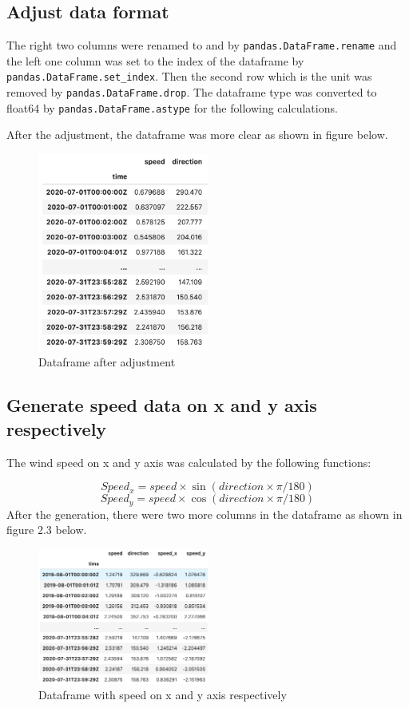 \documentclass[10pt]{report}
\begin{document}
\subsection{Adjust data format}
The right two columns were renamed to  and  by \texttt{pandas.DataFrame.rename} and the left one column was set to the index of the dataframe by \texttt{pandas.DataFrame.set\_index}. Then the second row which is the unit was removed by \texttt{pandas.DataFrame.drop}. The dataframe type was converted to float64 by \texttt{pandas.DataFrame.astype} for the following calculations.\par
After the adjustment, the dataframe was more clear as shown in figure below.\par
\begin{figure}[h!]
    \centering
    \includegraphics[width=0.50\textwidth]{images/processed_dataframe.png}
    \caption{Dataframe after adjustment}
    \label{fig: PaleBlueDot}    
\end{figure}
\subsection{Generate speed data on x and y axis respectively}
The wind speed on x and y axis was calculated by the following functions:\par
\[Speed_x = speed \times \sin(direction \times \pi / 180)\]
\[Speed_y = speed \times \cos(direction \times \pi / 180)\]
After the generation, there were two more columns in the dataframe as shown in figure 2.3 below.\par
\begin{figure}[h!]
    \centering
    \includegraphics[width=0.50\textwidth]{images/processed_dataframe_xy.png}
    \caption{Dataframe with speed on x and y axis respectively}
    \label{fig: PaleBlueDot}    
\end{figure}
\end{document}
